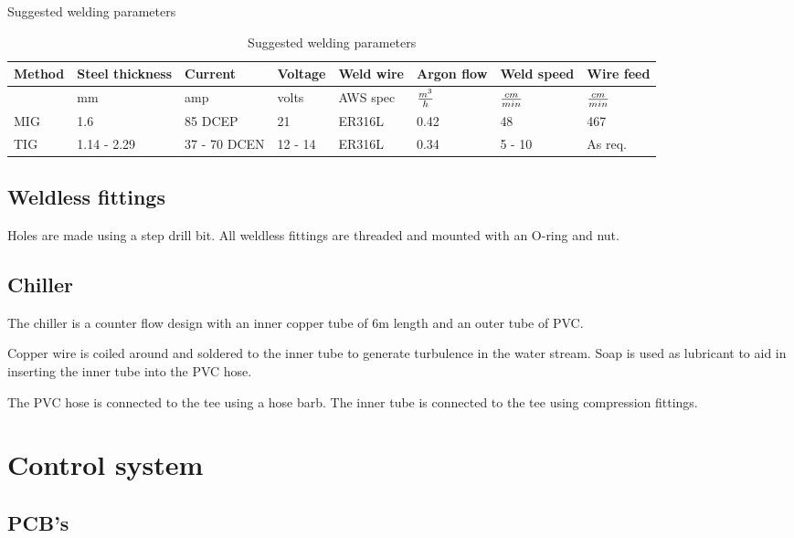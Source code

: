\documentclass[11pt,fleqn,openany]{book} %
\begin{document}
Suggested welding parameters %

\begin{table}[ht!]
\centering
\begin{tabular}{l l l l l l l l}
\toprule
Method & Steel thickness & Current & Voltage & Weld wire & Argon flow & Weld speed & Wire feed\\ 
\toprule
 & mm & amp & volts & AWS spec & $m^3 \over h$ & $cm \over min$ & $cm \over min$\\
\midrule
MIG & 1.6 & 85 DCEP & 21 & ER316L & 0.42 & 48 & 467\\
TIG & 1.14 - 2.29 & 37 - 70 DCEN & 12 - 14 & ER316L & 0.34 & 5 - 10 & As req.\\
\bottomrule
\end{tabular}
\caption{Suggested welding parameters}
\end{table}

\section{Weldless fittings}

Holes are made using a step drill bit. All weldless fittings are threaded and mounted with an O-ring and nut.

\section{Chiller}

The chiller is a counter flow design with an inner copper tube of 6m length and an outer tube of PVC.

Copper wire is coiled around and soldered to the inner tube to generate turbulence in the water stream. Soap is used as lubricant to aid in inserting the inner tube into the PVC hose.

The PVC hose is connected to the tee using a hose barb. The inner tube is connected to the tee using compression fittings.



\chapter{Control system}

\section{PCB's}
\end{document}
